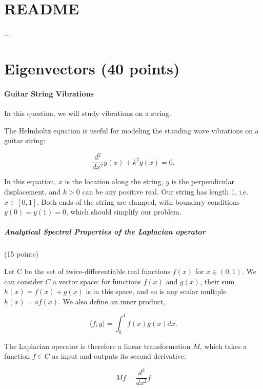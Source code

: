\documentclass[10pt]{article}
\title{\documenttitle \vspace{1ex} \\ \Large \coursetitle \vspace{-1ex}}
\author{\authorname\vspace{-1ex}}
\begin{document}
\maketitle


\section{README}

... 

\section{Eigenvectors (40 points)}

\paragraph{Guitar String Vibrations} In this question, we will study vibrations on a string.
 
The Helmholtz equation is useful for modeling the standing wave vibrations on a guitar string:

\begin{equation}
    \label{eq:helmholtz}
    \frac{d^2}{dx^2} y(x) + k^2y(x)=0.
\end{equation}

In this equation, $x$ is the location along the string, $y$ is the perpendicular displacement, and $k > 0$ can be any positive real.
Our string has length 1, i.e. $x \in [0, 1]$.
Both ends of the string are clamped, with boundary conditions $y(0) = y(1) = 0$, which should simplify our problem.

\subparagraph{Analytical Spectral Properties of the Laplacian operator} (15 points)

Let C be the set of twice-differentiable real functions $f(x)$ for $x \in (0, 1)$. We can consider $C$ a vector space: 
for functions $f(x)$ and $g(x)$, their sum $h(x) = f(x) + g(x)$ is in this space, and so is any scalar multiple $h(x) = a f(x)$. 
We also define an inner product,

$$
\langle f, g\rangle=\int_{0}^{1} f(x) g(x) d x.
$$

The Laplacian operator is therefore a linear transformation $M$, which takes a function $f \in C$ as input and outputs its second derivative:

$$
M f=\frac{d^{2}}{d x^{2}} f
$$
\end{document}
